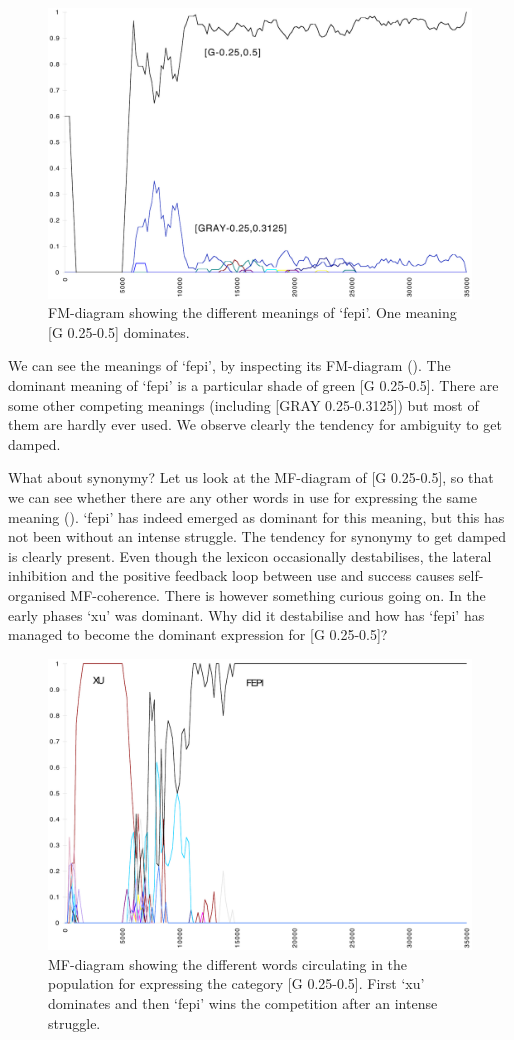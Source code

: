 \begin{figure}[htbp]
  \centerline{\includegraphics[width=.80\textwidth]{chap7/figs/FM-FEPI}}
\caption{ \label{fm-fepi} FM-diagram showing the different
meanings of `fepi'. One meaning [G 0.25-0.5] dominates.}
\end{figure}
We can see the meanings of `fepi', by 
inspecting its FM-diagram (). 
The dominant meaning of `fepi' is 
a particular shade of green [G 0.25-0.5]. There are 
some other competing meanings (including [GRAY 0.25-0.3125])
but most of them are hardly ever used. We observe clearly 
the tendency for ambiguity to get damped. 

What about synonymy? Let us look at the 
MF-diagram of [G 0.25-0.5], so that we can
see whether there are any other words in use for expressing
the same meaning ().
`fepi' has indeed emerged as dominant for this meaning, but 
this has not been without an intense struggle.
The tendency for synonymy to get damped is clearly present. 
Even though the lexicon occasionally destabilises, 
the lateral inhibition and the positive feedback loop between use 
and success causes self-organised MF-coherence. 
There is however something curious going on. 
In the early phases `xu' was dominant. Why did it 
destabilise and how has `fepi' has managed to become the
dominant expression for [G 0.25-0.5]? 

\begin{figure}[htbp]
  \centerline{\includegraphics[width=.80\textwidth]{chap7/figs/MF-G-025-050}}
\caption{ \label{g02505.f} MF-diagram showing the
different words circulating in the population for expressing
the category [G 0.25-0.5]. First `xu' dominates and 
then `fepi' wins the competition after an intense struggle.}
\end{figure}

